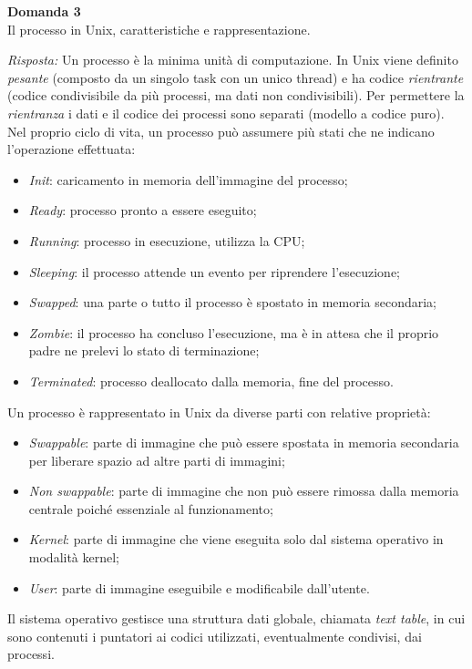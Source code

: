 \documentclass{article}
\newenvironment{problem}[2][Domanda]
    { \begin{mdframed}[backgroundcolor=gray!20] \textbf{#1 #2} \\}
    {  \end{mdframed}}
\newenvironment{solution}
    {\textit{Risposta:}}
    {}
\begin{document}
\begin{problem}{3}
Il processo in Unix, caratteristiche e rappresentazione.
\end{problem}
\begin{solution}
Un processo è la minima unità di computazione.
\newline
In Unix viene definito \textit{pesante} (composto da un singolo task con un unico thread) e ha codice \textit{rientrante} (codice condivisibile da più processi, ma dati non condivisibili).
Per permettere la \textit{rientranza} i dati e il codice dei processi sono separati (modello a codice puro).
\newline
Nel proprio ciclo di vita, un processo può assumere più stati che ne indicano l’operazione effettuata:
\begin{itemize}
    \item \emph{Init}: caricamento in memoria dell’immagine del processo;
    \item \emph{Ready}: processo pronto a essere eseguito;
    \item \emph{Running}: processo in esecuzione, utilizza la CPU;
    \item \emph{Sleeping}: il processo attende un evento per riprendere l’esecuzione;
    \item \emph{Swapped}: una parte o tutto il processo è spostato in memoria secondaria;
    \item \emph{Zombie}: il processo ha concluso l'esecuzione, ma è in attesa che il proprio padre ne prelevi lo stato di terminazione;
    \item \emph{Terminated}: processo deallocato dalla memoria, fine del processo.
\end{itemize}
Un processo è rappresentato in Unix da diverse parti con relative proprietà:
\begin{itemize}
    \item \emph{Swappable}: parte di immagine che può essere spostata in memoria secondaria per liberare spazio ad altre parti di immagini;
    \item \emph{Non swappable}: parte di immagine che non può essere rimossa dalla memoria centrale poiché essenziale al funzionamento;
    \item \emph{Kernel}: parte di immagine che viene eseguita solo dal sistema operativo in modalità kernel;
    \item \emph{User}: parte di immagine eseguibile e modificabile dall’utente.
\end{itemize}
Il sistema operativo gestisce una struttura dati globale, chiamata \textit{text table}, in cui sono contenuti i puntatori ai codici utilizzati, eventualmente condivisi, dai processi.

\end{solution}
\end{document}
